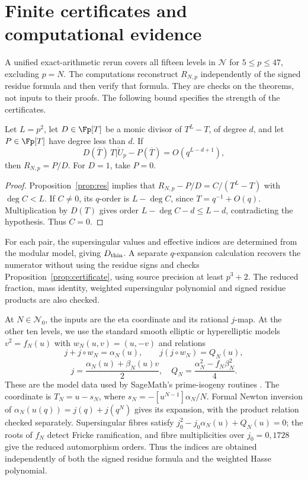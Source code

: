 \section{Finite certificates and computational evidence}\label{sec:comp}
A unified exact-arithmetic rerun covers all fifteen levels in $\mathcal N$
for $5\le p\le47$, excluding $p=N$. The computations reconstruct
$R_{N,p}$ independently of the signed residue formula and then verify
that formula. They are checks on the theorems, not inputs to their proofs.
The following bound specifies the strength of the certificates.

\begin{proposition}\label{prop:certificate}
Let $L=p^2$, let $D\in\Fp[T]$ be a monic divisor of $T^L-T$, of degree $d$, and
let $P\in\Fp[T]$ have degree less than $d$. If
\[
D(\overline T)\,\overline{T|U_p}-P(\overline T)=O(q^{L-d+1}),
\]
then $R_{N,p}=P/D$. For $D=1$, take $P=0$.
\end{proposition}
\begin{proof}
Proposition~\ref{prop:res} implies that
$R_{N,p}-P/D=C/(T^L-T)$ with $\deg C<L$.
If $C\ne0$, its $q$-order is $L-\deg C$, since $T=q^{-1}+O(q)$.
Multiplication by $D(T)$ gives order $L-\deg C-d\le L-d$, contradicting the
hypothesis. Thus $C=0$.
\end{proof}

For each pair, the supersingular values and effective indices are determined
from the modular model, giving $D_{\rm thin}$. A separate $q$-expansion
calculation recovers the numerator without using the residue signs and
checks Proposition~\ref{prop:certificate}, using source precision at least
$p^3+2$. The reduced fraction, mass identity, weighted supersingular
polynomial and signed residue products are also checked.

At $N\in\mathcal N_0$, the inputs are the eta coordinate and its rational
$j$-map. At the other ten levels, we use the standard smooth elliptic or
hyperelliptic models $v^2=f_N(u)$ with $w_N(u,v)=(u,-v)$ and relations
\[
j+j\circ w_N=\alpha_N(u),\qquad
j(j\circ w_N)=Q_N(u),
\]
\[
j=\frac{\alpha_N(u)+\beta_N(u)v}{2},
\quad Q_N=\frac{\alpha_N^2-f_N\beta_N^2}{4}.
\]
These are the model data used by SageMath's prime-isogeny routines
\citep{SageModels}. The coordinate is $T_N=u-s_N$, where
$s_N=-[u^{N-1}]\alpha_N/N$. Formal Newton inversion of
$\alpha_N(u(q))=j(q)+j(q^N)$ gives its expansion, with the product relation
checked separately. Supersingular fibres satisfy
$j_0^2-j_0\alpha_N(u)+Q_N(u)=0$; the roots of $f_N$ detect Fricke
ramification, and fibre multiplicities over $j_0=0,1728$ give the reduced
automorphism orders. Thus the indices are obtained independently of both
the signed residue formula and the weighted Hasse polynomial.

